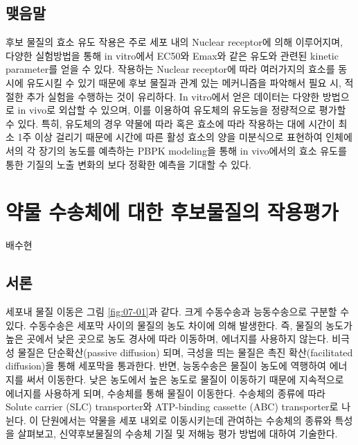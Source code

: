 \documentclass[
  11pt,
  krantz2, a4paper, twoside]{krantz}
\begin{document}
\hypertarget{uxb9fauxc74cuxb9d0-4}{%
\section{맺음말}\label{uxb9fauxc74cuxb9d0-4}}

후보 물질의 효소 유도 작용은 주로 세포 내의 Nuclear receptor에 의해
이루어지며, 다양한 실험방법을 통해 in vitro에서 EC50와 Emax와 같은
유도와 관련된 kinetic parameter를 얻을 수 있다. 작용하는 Nuclear
receptor에 따라 여러가지의 효소를 동시에 유도시킬 수 있기 때문에 후보
물질과 관계 있는 메커니즘을 파악해서 필요 시, 적절한 추가 실험을
수행하는 것이 유리하다. In vitro에서 얻은 데이터는 다양한 방법으로 in
vivo로 외삽할 수 있으며, 이를 이용하여 유도체의 유도능을 정량적으로
평가할 수 있다. 특히, 유도체의 경우 약물에 따라 혹은 효소에 따라
작용하는 대에 시간이 최소 1주 이상 걸리기 때문에 시간에 따른 활성 효소의
양을 미분식으로 표현하여 인체에서의 각 장기의 농도를 예측하는 PBPK
modeling을 통해 in vivo에서의 효소 유도를 통한 기질의 노출 변화의 보다
정확한 예측을 기대할 수 있다.

\hypertarget{uxc57duxbb3c-uxc218uxc1a1uxccb4uxc5d0-uxb300uxd55c-uxd6c4uxbcf4uxbb3cuxc9c8uxc758-uxc791uxc6a9uxd3c9uxac00}{%
\chapter{약물 수송체에 대한 후보물질의 작용평가}\label{uxc57duxbb3c-uxc218uxc1a1uxccb4uxc5d0-uxb300uxd55c-uxd6c4uxbcf4uxbb3cuxc9c8uxc758-uxc791uxc6a9uxd3c9uxac00}}

\Large\hfill

배수현 \normalsize

\hypertarget{uxc11cuxb860-6}{%
\section{서론}\label{uxc11cuxb860-6}}

세포내 물질 이동은 그림 \ref{fig:07-01}과 같다. 크게 수동수송과
능동수송으로 구분할 수 있다. 수동수송은 세포막 사이의 물질의 농도 차이에
의해 발생한다. 즉, 물질의 농도가 높은 곳에서 낮은 곳으로 농도 경사에
따라 이동하며, 에너지를 사용하지 않는다. 비극성 물질은 단순확산(passive
diffusion) 되며, 극성을 띄는 물질은 촉진 확산(facilitated diffusion)을
통해 세포막을 통과한다. 반면, 능동수송은 물질이 농도에 역행하여 에너지를
써서 이동한다. 낮은 농도에서 높은 농도로 물질이 이동하기 때문에
지속적으로 에너지를 사용하게 되며, 수송체를 통해 물질이 이동한다.
수송체의 종류에 따라 Solute carrier (SLC) transporter와 ATP-binding
cassette (ABC) transporter로 나뉜다. 이 단원에서는 약물을 세포 내외로
이동시키는데 관여하는 수송체의 종류와 특성을 살펴보고, 신약후보물질의
수송체 기질 및 저해능 평가 방법에 대하여 기술한다.
\end{document}

